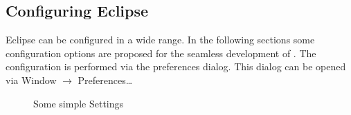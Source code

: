 \documentclass{extex-doc}
\newcommand\menu{\textsf}
\newcommand\sub{\(\rightarrow\) }
\begin{document}
\subsection{Configuring Eclipse}

Eclipse can be configured in a wide range. In the following sections
some configuration options are proposed for the seamless development
of \ExTeX. The configuration is performed via the preferences dialog.
This dialog can be opened via \menu{Window \sub Preferences\ldots}
\begin{figure}[htp]
  \hbox{}\hfill
  \hfill
  \caption{Some simple Settings}
\end{figure}
\end{document}
